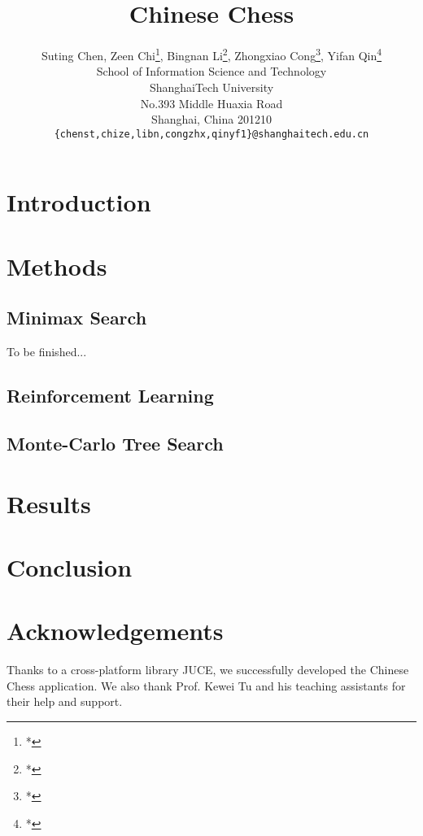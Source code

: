 \documentclass[letterpaper]{article}
\title{Chinese Chess}
\author{Suting Chen, Zeen Chi\footnote[2]{*}, Bingnan Li\footnote[2]{*}, Zhongxiao Cong\footnote[2]{*}, Yifan Qin\footnote[2]{*}\\
School of Information Science and Technology\\
ShanghaiTech University\\
No.393 Middle Huaxia Road\\
Shanghai, China 201210\\
\texttt{\{chenst,chize,libn,congzhx,qinyf1\}@shanghaitech.edu.cn}
}
\begin{document}
\maketitle

\begin{abstract}
\begin{quote}

\end{quote}
\end{abstract}

\section{Introduction}\label{sec:introduction}


\section{Methods}\label{sec:methods}

\subsection{Minimax Search}\label{subsec:minimax-search}
To be finished...
\subsection{Reinforcement Learning}\label{subsec:reinforcement-learning}

\subsection{Monte-Carlo Tree Search}\label{subsec:monte-carlo-tree-search}


\section{Results}\label{sec:results}


\section{Conclusion}\label{sec:conclusion}


\section{Acknowledgements}\label{sec:acknowledgements}

Thanks to a cross-platform library JUCE, we successfully developed the Chinese Chess application.
We also thank Prof. Kewei Tu and his teaching assistants for their help and support.



\end{document}
